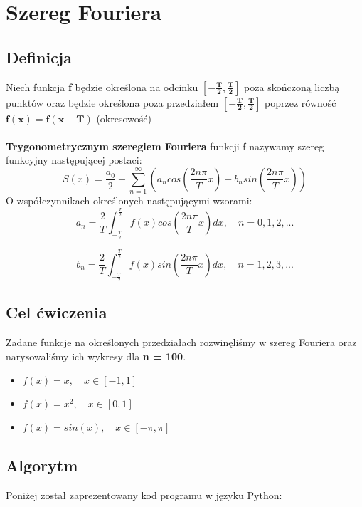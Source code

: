 \section{Szereg Fouriera}
\subsection{Definicja}
Niech funkcja \textbf{f} będzie określona na odcinku $\mathbf{\left[-\frac{T}{2}, \frac{T}{2}\right]}$ poza skończoną liczbą punktów oraz będzie określona poza przedziałem $\mathbf{\left[-\frac{T}{2}, \frac{T}{2}\right]}${\tiny } poprzez równość $\mathbf{f(x) = f(x + T)}$ (okresowość)
\\ \\
\textbf{Trygonometrycznym szeregiem Fouriera} funkcji f nazywamy szereg funkcyjny następującej postaci:
$$S(x) = \frac{a_{0}}{2} + \sum_{n=1}^{\infty} \left(a_{n} cos\left(\frac{2n\pi}{T} x\right) + b_{n} sin\left(\frac{2n\pi}{T} x\right) \right)$$
O współczynnikach określonych następującymi wzorami:
$$ a_{n} = \frac{2}{T} \int_{-\frac{T}{2}}^{\frac{T}{2}} f(x)cos\left(\frac{2n\pi}{T} x \right) dx,	\quad n = 0,1,2,...$$

$$ b_{n} = \frac{2}{T} \int_{-\frac{T}{2}}^{\frac{T}{2}} f(x)sin\left(\frac{2n\pi}{T} x \right) dx,	\quad n = 1,2,3,...$$


\subsection{Cel ćwiczenia}
Zadane funkcje na określonych przedziałach rozwinęliśmy w szereg Fouriera oraz narysowaliśmy ich wykresy dla \textbf{n = 100}.

\begin{itemize}
    \item $f(x) = x, \quad x\in [-1,1]$
    
    \item $f(x) = x^{2}, \quad x\in [0,1]$
    
    \item $f(x) = sin(x), \quad x\in [-\pi,\pi]$
\end{itemize}

\subsection{Algorytm}
\vspace*{0.1cm}
Poniżej został zaprezentowany kod programu w języku Python:\\

